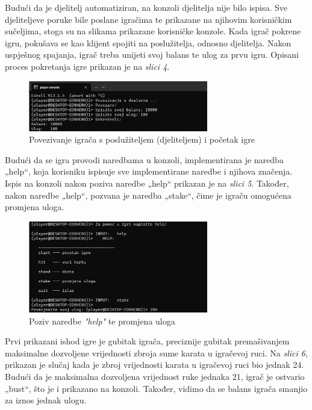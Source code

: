 \documentclass{IEEEcsmag}
\begin{document}
Budući da je djelitelj automatiziran, na konzoli djelitelja nije bilo ispisa. Sve djeliteljeve poruke bile poslane igračima te prikazane na njihovim korisničkim sučeljima, stoga su na slikama prikazane korisničke konzole.
Kada igrač pokrene igru, pokušava se kao klijent spojiti na poslužitelja, odnosno djelitelja. Nakon uspješnog spajanja, igrač treba unijeti svoj balans te ulog za prvu igru. Opisani proces pokretanja igre prikazan je na \textit{slici 4}.

\begin{figure}[H]
\centerline{\includegraphics[width=18.5pc]{1.jpeg}}
\caption{Povezivanje igrača s poslužiteljem (djeliteljem) i početak igre}
\vspace*{-5pt}
\end{figure}

Budući da se igra provodi naredbama u konzoli, implementirana je naredba „help“, koja korisniku ispisuje sve implementirane naredbe i njihova značenja. Ispis na konzoli nakon poziva naredbe „help“ prikazan je na \textit{slici 5}. Također, nakon naredbe „help“, pozvana je naredba „stake“, čime je igraču omogućena promjena uloga.

\begin{figure}[H]
\centerline{\includegraphics[width=18.5pc]{2.jpeg}}
\caption{Poziv naredbe \textit{"help"} te promjena uloga}
\vspace*{-5pt}
\end{figure}

Prvi prikazani ishod igre je gubitak igrača, preciznije gubitak premašivanjem maksimalne dozvoljene vrijednosti zbroja sume karata u igračevoj ruci. Na \textit{slici 6}, prikazan je slučaj kada je zbroj vrijednosti karata u igračevoj ruci bio jednak 24. Budući da je maksimalna dozvoljena vrijednost ruke jednaka 21, igrač je ostvario „bust“, što je i prikazano na konzoli. Također, vidimo da se balans igrača smanjio za iznos jednak ulogu.
\end{document}
